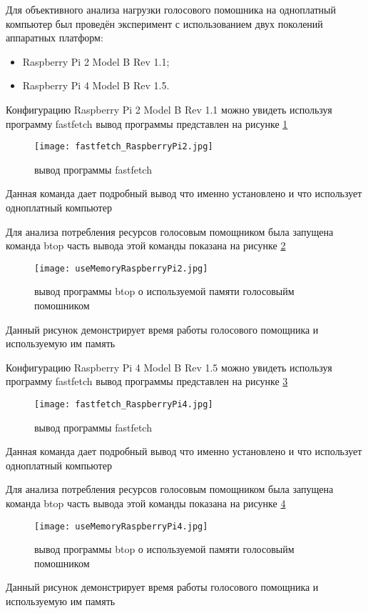 Для объективного анализа нагрузки голосового помошника на одноплатный компьютер был проведён эксперимент с использованием двух поколений аппаратных платформ:
\begin{itemize}
	\item Raspberry Pi 2 Model B Rev 1.1;
	\item Raspberry Pi 4 Model B Rev 1.5.
\end{itemize}

Конфигурацию Raspberry Pi 2 Model B Rev 1.1 можно увидеть используя программу fastfetch вывод программы представлен на рисунке \ref{fig:fastfetch_RaspberryPi2}
\begin{figure}[H]
	\centering
	\texttt{[image: fastfetch\_RaspberryPi2.jpg]}
	\caption{вывод программы fastfetch}
	\label{fig:fastfetch_RaspberryPi2}
\end{figure}
Данная команда дает подробный вывод что именно установлено и что использует одноплатный компьютер

Для анализа потребления ресурсов голосовым помощником была запущена команда btop часть вывода этой команды показана на рисунке \ref{fig:useMemoryRaspberryPi2}
\begin{figure}[H]
	\centering
	\texttt{[image: useMemoryRaspberryPi2.jpg]}
	\caption{вывод программы btop о используемой памяти голосовыйм помошником}
	\label{fig:useMemoryRaspberryPi2}
\end{figure}
Данный рисунок демонстрирует время работы голосового помощника и используемую им память 

Конфигурацию Raspberry Pi 4 Model B Rev 1.5 можно увидеть используя программу fastfetch вывод программы представлен на рисунке \ref{fig:fastfetch_RaspberryPi4}
\begin{figure}[H]
	\centering
	\texttt{[image: fastfetch\_RaspberryPi4.jpg]}
	\caption{вывод программы fastfetch}
	\label{fig:fastfetch_RaspberryPi4}
\end{figure}
Данная команда дает подробный вывод что именно установлено и что использует одноплатный компьютер

Для анализа потребления ресурсов голосовым помощником была запущена команда btop часть вывода этой команды показана на рисунке \ref{fig:useMemoryRaspberryPi4}
\begin{figure}[H]
	\centering
	\texttt{[image: useMemoryRaspberryPi4.jpg]}
	\caption{вывод программы btop о используемой памяти голосовыйм помошником}
	\label{fig:useMemoryRaspberryPi4}
\end{figure}
Данный рисунок демонстрирует время работы голосового помощника и используемую им память 

